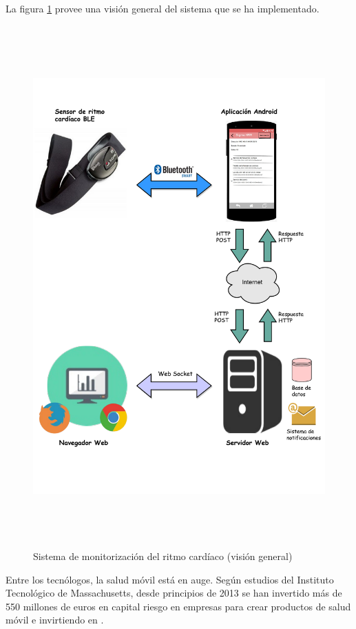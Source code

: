 	La figura \ref{figure:esquemaIntro} provee una visión general del sistema que se ha implementado.
	
	\begin{figure}[!htbp] \centering
		\includegraphics[height=20cm]{graphs/esquemaIntroductorio.pdf}
		\caption{Sistema de monitorización del ritmo cardíaco (visión general)}
		\label{figure:esquemaIntro} 
	\end{figure}
    

    Entre los tecnólogos, la salud móvil está en auge. Según estudios del Instituto Tecnológico de Massachusetts, desde principios de 2013 se han invertido más de 550 millones de euros en capital riesgo en empresas para crear productos de salud móvil e invirtiendo en .
    
